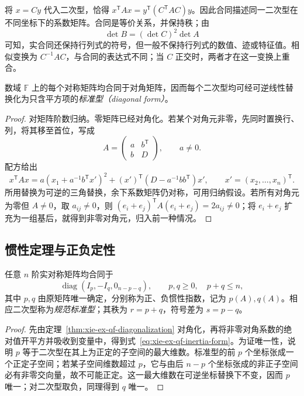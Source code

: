 将 $x=Cy$ 代入二次型，恰得 $x^{\mathsf T}Ax=y^{\mathsf T}(C^{\mathsf T}AC)y$。因此合同描述同一二次型在不同坐标下的系数矩阵。合同是等价关系，并保持秩；由
\[
 \det B=(\det C)^2\det A
\]
可知，实合同还保持行列式的符号，但一般不保持行列式的数值、迹或特征值。相似变换为 $C^{-1}AC$，与合同的表达式不同；当 $C$ 正交时，两者才在这一变换上重合。

\begin{theorem}
\label{thm:xie-ex-qf-diagonalization}
数域 $\mathbb F$ 上的每个对称矩阵均合同于对角矩阵，因而每个二次型均可经可逆线性替换化为只含平方项的\emph{标准型（diagonal form）}。
\end{theorem}
\begin{proof}
对矩阵阶数归纳。零矩阵已经对角化。若某个对角元非零，先同时置换行、列，将其移至首位，写成
\[
 A=\begin{pmatrix}a&b^{\mathsf T}\\b&D\end{pmatrix},\qquad a\ne0.
\]
配方给出
\[
 x^{\mathsf T}Ax
 =a\left(x_1+a^{-1}b^{\mathsf T}x'\right)^2
  +(x')^{\mathsf T}(D-a^{-1}bb^{\mathsf T})x',
 \qquad x'=(x_2,\ldots,x_n)^{\mathsf T}.
\]
所用替换为可逆的三角替换，余下系数矩阵仍对称，可用归纳假设。若所有对角元为零但 $A\ne0$，取 $a_{ij}\ne0$，则 $(e_i+e_j)^{\mathsf T}A(e_i+e_j)=2a_{ij}\ne0$；将 $e_i+e_j$ 扩充为一组基后，就得到非零对角元，归入前一种情况。
\end{proof}

\subsection{惯性定理与正负定性}

\begin{theorem}
\label{thm:xie-ex-qf-inertia}
任意 $n$ 阶实对称矩阵均合同于
\begin{equation}
 \operatorname{diag}(I_p,-I_q,0_{n-p-q}),\qquad p,q\ge0,\quad p+q\le n,
 \label{eq:xie-ex-qf-inertia-form}
\end{equation}
其中 $p,q$ 由原矩阵唯一确定，分别称为正、负惯性指数，记为 $p(A),q(A)$。相应二次型称为\emph{规范标准型}；其秩为 $r=p+q$，符号差为 $s=p-q$。
\end{theorem}
\begin{proof}
先由定理~\ref{thm:xie-ex-qf-diagonalization} 对角化，再将非零对角系数的绝对值开平方并吸收到变量中，得到式~\eqref{eq:xie-ex-qf-inertia-form}。为证唯一性，说明 $p$ 等于二次型在其上为正定的子空间的最大维数。标准型的前 $p$ 个坐标张成一个正定子空间；若某子空间维数超过 $p$，它与由后 $n-p$ 个坐标张成的非正子空间必有非零交向量，故不可能正定。这一最大维数在可逆坐标替换下不变，因而 $p$ 唯一；对二次型取负，同理得到 $q$ 唯一。
\end{proof}


